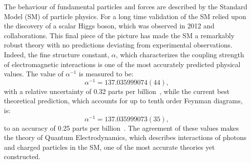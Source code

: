 The behaviour of fundamental particles and forces are described by the Standard Model (SM) of
particle physics.
For a long time validation of the SM relied upon the discovery of a scalar Higgs boson, which was
observed in 2012 \cms and \atlas collaborations.
This final piece of the picture has made the SM a remarkably robust theory with no predictions
deviating from experimental observations.
Indeed, the fine structure constant, $\alpha$, which characterizes the coupling strength of
electromagnetic interactions is one of the most accurately predicted physical values.
The value of $\alpha^{-1}$ is measured to be:
\begin{equation}
  \alpha^{-1} = 137.035 999 074 (44),
\end{equation}
with a relative uncertainty of 0.32 parts per billion~\cite{PDG2012}, while the current best theoretical
prediction, which accounts for up to tenth order Feynman diagrams, is:
\begin{equation}
  \alpha^{-1} = 137.035 999 073 (35),
\end{equation}
to an accuracy of 0.25 parts per billion~\cite{Aoyama:2012wj}.
The agreement of these values makes the theory of Quantum Electrodynamics, which describes
interactions of photons and charged particles in the SM, one of the most accurate theories yet
constructed.



